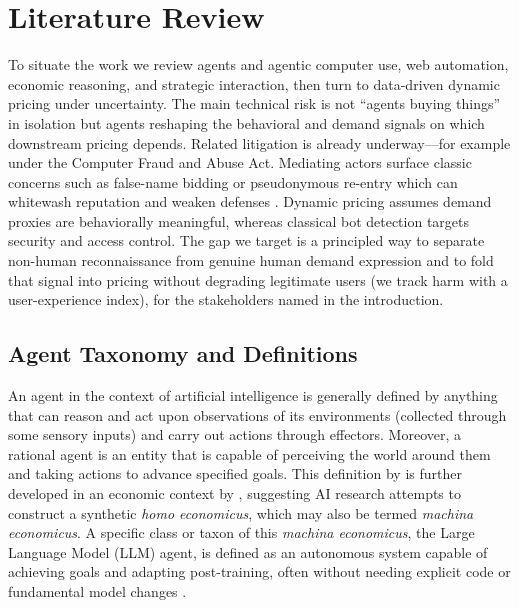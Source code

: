 \section{Literature Review}
\label{sec:literature_review}

To situate the work we review agents and agentic computer use, web automation, economic reasoning, and strategic interaction, then turn to data-driven dynamic pricing under uncertainty. The main technical risk is not ``agents buying things'' in isolation but agents reshaping the behavioral and demand signals on which downstream pricing depends. Related litigation is already underway---for example \textcite{noauthor_amazoncom_2026} under the Computer Fraud and Abuse Act. Mediating actors surface classic concerns such as false-name bidding \parencite{yokoo_effect_2004} or pseudonymous re-entry which can whitewash reputation and weaken defenses \parencite{feldman_free-riding_2004}. Dynamic pricing assumes demand proxies are behaviorally meaningful, whereas classical bot detection targets security and access control. The gap we target is a principled way to separate non-human reconnaissance from genuine human demand expression and to fold that signal into pricing without degrading legitimate users (we track harm with a user-experience index), for the stakeholders named in the introduction.

\subsection{Agent Taxonomy and Definitions}

An agent in the context of artificial intelligence is generally defined by anything that can reason and act upon observations of its environments (collected through some sensory inputs) and carry out actions through effectors. Moreover, a rational agent is an entity that is capable of perceiving the world around them and taking actions to advance specified goals. This definition by \textcite{russell_artificial_2021} is further developed in an economic context by \textcite{parkes_economic_2015}, suggesting AI research attempts to construct a synthetic \textit{homo economicus}, which may also be termed \textit{machina economicus}.
A specific class or taxon of this \textit{machina economicus}, the Large Language Model (LLM) agent, is defined as an autonomous system capable of achieving goals and adapting post-training, often without needing explicit code or fundamental model changes \parencite{xia_evaluation-driven_2025}.

